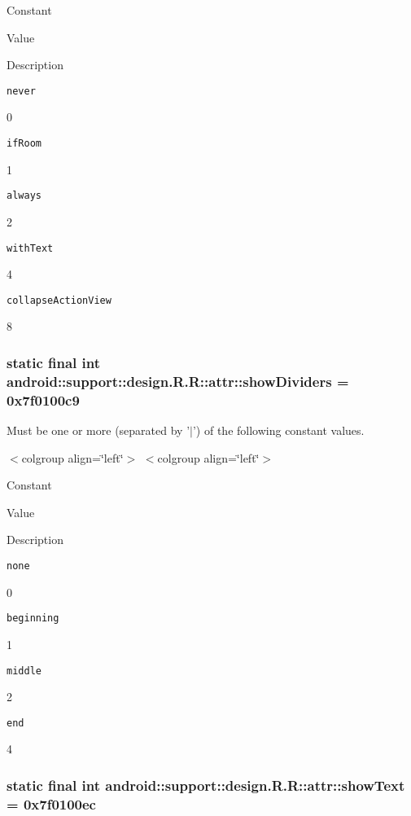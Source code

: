 Constant

Value

Description 

{\tt never}

0

{\tt ifRoom}

1

{\tt always}

2

{\tt withText}

4

{\tt collapseActionView}

8\hypertarget{classandroid_1_1support_1_1design_1_1_r_1_1attr_d8e18ab9e4ad0ea3e96a7a7f89883f5a}{
\subsubsection[{showDividers}]{\setlength{\rightskip}{0pt plus 5cm}static final int android::support::design.R.R::attr::showDividers = 0x7f0100c9}}
\label{classandroid_1_1support_1_1design_1_1_r_1_1attr_d8e18ab9e4ad0ea3e96a7a7f89883f5a}


Must be one or more (separated by '$|$') of the following constant values. \begin{TabularC}{0}
\hline
\end{TabularC}
$<$colgroup align=\char`\"{}left\char`\"{}$>$ $<$colgroup align=\char`\"{}left\char`\"{}$>$ 

Constant

Value

Description 

{\tt none}

0

{\tt beginning}

1

{\tt middle}

2

{\tt end}

4\hypertarget{classandroid_1_1support_1_1design_1_1_r_1_1attr_080f289b9839fa615e80e31c42f5e8e6}{
\subsubsection[{showText}]{\setlength{\rightskip}{0pt plus 5cm}static final int android::support::design.R.R::attr::showText = 0x7f0100ec}}
\label{classandroid_1_1support_1_1design_1_1_r_1_1attr_080f289b9839fa615e80e31c42f5e8e6}


